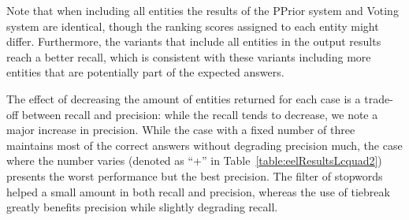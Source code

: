 Note that when including all entities the results of the PPrior system and Voting system are 
identical, though the ranking scores assigned to each entity might differ. Furthermore, the 
variants that include all entities in the output results reach a better recall, which is 
consistent with these variants including more entities that are potentially part of the expected 
answers.

The effect of decreasing the amount of entities returned for each case is a trade-off between 
recall and precision: while the recall tends to decrease, we note a major increase in precision. 
While the case with a fixed number of three maintains most of the correct answers without 
degrading precision much, the case where the number varies (denoted as “+” in Table~\ref{table:eelResultsLcquad2}) 
presents the worst performance but the best precision. The filter of stopwords helped a small 
amount in both recall and precision, whereas the use of tiebreak greatly benefits precision 
while slightly degrading recall.

